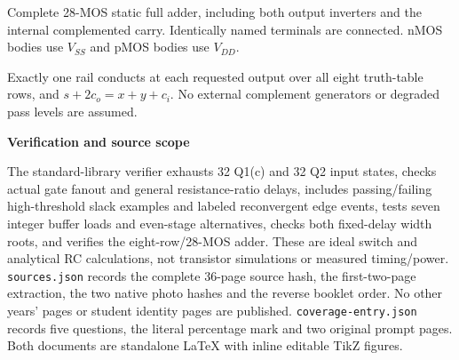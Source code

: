 \documentclass[10pt]{article}
\newcommand{\mos}[4]{\begin{scope}[shift={(#1,#2)}]
\draw (0,.24)--(0,-.24);\draw (0,.20)--(.25,.20)--(.25,.5);
\draw (0,-.20)--(.25,-.20)--(.25,-.5);\draw (-.16,.23)--(-.16,-.23);
\ifnum#4=1\draw (-.26,0) circle (.06);\draw (-.75,0)--(-.32,0);\else\draw (-.75,0)--(-.16,0);\fi
\node[anchor=east,font=\scriptsize] at (-.76,0) {$#3$};\end{scope}}
\newcommand{\qheading}[1]{\par\medskip\textbf{#1}\par}
\begin{document}
\begin{center}
\end{center}
\small Complete 28-MOS static full adder, including both output inverters and the internal complemented carry. Identically named terminals are connected. nMOS bodies use $V_{SS}$ and pMOS bodies use $V_{DD}$.\normalsize\par
Exactly one rail conducts at each requested output over all eight truth-table rows, and $s+2c_o=x+y+c_i$. No external complement generators or degraded pass levels are assumed.
\qheading{Verification and source scope}
The standard-library verifier exhausts 32 Q1(c) and 32 Q2 input states, checks actual gate fanout and general resistance-ratio delays, includes passing/failing high-threshold slack examples and labeled reconvergent edge events, tests seven integer buffer loads and even-stage alternatives, checks both fixed-delay width roots, and verifies the eight-row/28-MOS adder. These are ideal switch and analytical RC calculations, not transistor simulations or measured timing/power.
\texttt{sources.json} records the complete 36-page source hash, the first-two-page extraction, the two native photo hashes and the reverse booklet order. No other years' pages or student identity pages are published. \texttt{coverage-entry.json} records five questions, the literal percentage mark and two original prompt pages. Both documents are standalone LaTeX with inline editable TikZ figures.
\end{document}
